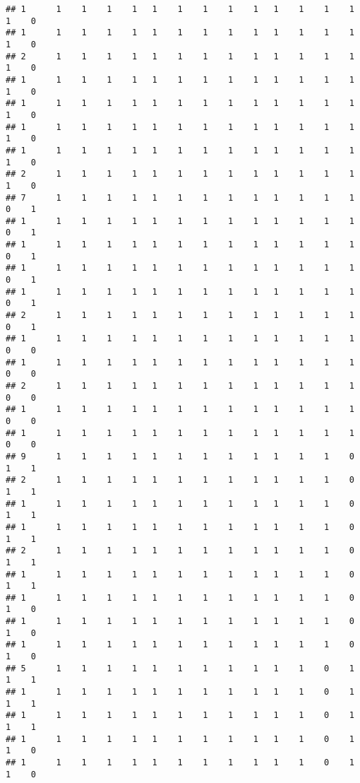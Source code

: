 \documentclass[
]{article}
\begin{document}
\begin{verbatim}
## 1      1    1    1    1   1    1    1    1    1   1    1    1    1    1    0
## 1      1    1    1    1   1    1    1    1    1   1    1    1    1    1    0
## 2      1    1    1    1   1    1    1    1    1   1    1    1    1    1    0
## 1      1    1    1    1   1    1    1    1    1   1    1    1    1    1    0
## 1      1    1    1    1   1    1    1    1    1   1    1    1    1    1    0
## 1      1    1    1    1   1    1    1    1    1   1    1    1    1    1    0
## 1      1    1    1    1   1    1    1    1    1   1    1    1    1    1    0
## 2      1    1    1    1   1    1    1    1    1   1    1    1    1    1    0
## 7      1    1    1    1   1    1    1    1    1   1    1    1    1    0    1
## 1      1    1    1    1   1    1    1    1    1   1    1    1    1    0    1
## 1      1    1    1    1   1    1    1    1    1   1    1    1    1    0    1
## 1      1    1    1    1   1    1    1    1    1   1    1    1    1    0    1
## 1      1    1    1    1   1    1    1    1    1   1    1    1    1    0    1
## 2      1    1    1    1   1    1    1    1    1   1    1    1    1    0    1
## 1      1    1    1    1   1    1    1    1    1   1    1    1    1    0    0
## 1      1    1    1    1   1    1    1    1    1   1    1    1    1    0    0
## 2      1    1    1    1   1    1    1    1    1   1    1    1    1    0    0
## 1      1    1    1    1   1    1    1    1    1   1    1    1    1    0    0
## 1      1    1    1    1   1    1    1    1    1   1    1    1    1    0    0
## 9      1    1    1    1   1    1    1    1    1   1    1    1    0    1    1
## 2      1    1    1    1   1    1    1    1    1   1    1    1    0    1    1
## 1      1    1    1    1   1    1    1    1    1   1    1    1    0    1    1
## 1      1    1    1    1   1    1    1    1    1   1    1    1    0    1    1
## 2      1    1    1    1   1    1    1    1    1   1    1    1    0    1    1
## 1      1    1    1    1   1    1    1    1    1   1    1    1    0    1    1
## 1      1    1    1    1   1    1    1    1    1   1    1    1    0    1    0
## 1      1    1    1    1   1    1    1    1    1   1    1    1    0    1    0
## 1      1    1    1    1   1    1    1    1    1   1    1    1    0    1    0
## 5      1    1    1    1   1    1    1    1    1   1    1    0    1    1    1
## 1      1    1    1    1   1    1    1    1    1   1    1    0    1    1    1
## 1      1    1    1    1   1    1    1    1    1   1    1    0    1    1    1
## 1      1    1    1    1   1    1    1    1    1   1    1    0    1    1    0
## 1      1    1    1    1   1    1    1    1    1   1    1    0    1    1    0

\end{verbatim}
\end{document}
